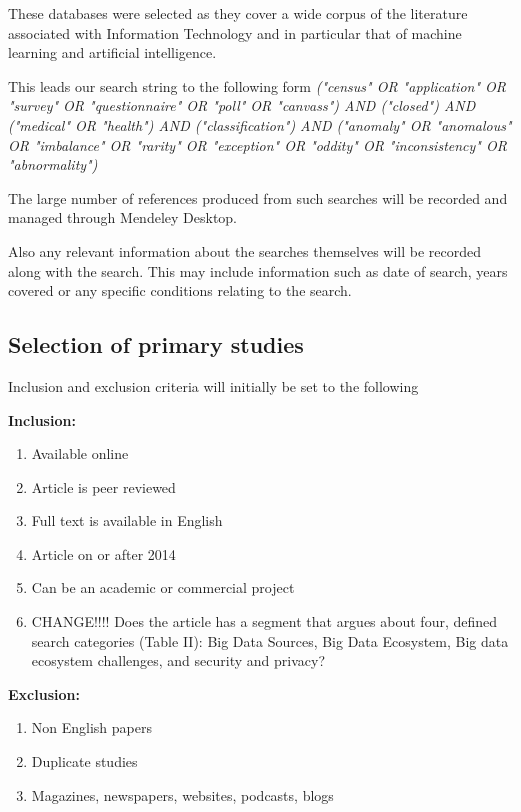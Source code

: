These databases were selected as they cover a wide corpus of the literature associated with Information Technology and in particular that of machine learning and artificial intelligence.



This leads our search string to the following form \textit{("census" OR "application" OR "survey" OR "questionnaire" OR "poll" OR "canvass") AND
  ("closed") AND
  ("medical" OR "health") AND
  ("classification") AND
  ("anomaly" OR "anomalous" OR "imbalance" OR "rarity" OR "exception" OR "oddity" OR "inconsistency" OR "abnormality")}

The large number of references produced from such searches will be recorded and managed through Mendeley Desktop.

Also any relevant information about the searches themselves will be recorded along with the search. This may include information such as date of search, years covered or any specific conditions relating to the search.

\subsection{Selection of primary studies}

\noindent
Inclusion and exclusion criteria will initially be set to the following

\noindent
\textbf{Inclusion:}
\begin{enumerate}
  \item Available online
  \item Article is peer reviewed
  \item Full text is available in English
  \item Article on or after 2014
  \item Can be an academic or commercial project
  \item CHANGE!!!! Does the article has a segment that argues about four, defined search categories (Table II): Big Data Sources, Big Data Ecosystem, Big data ecosystem challenges, and security and privacy?
\end{enumerate}

\noindent
\textbf{Exclusion:}
\begin{enumerate}
  \item Non English papers
  \item Duplicate studies
  \item Magazines, newspapers, websites, podcasts, blogs
\end{enumerate}

